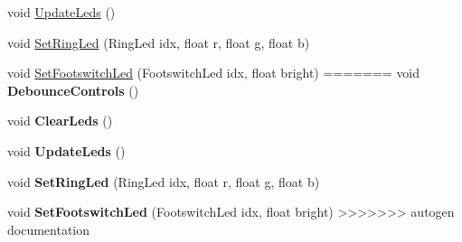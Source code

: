 \begin{DoxyCompactItemize}
\begin{DoxyCompactItemize}
\item 
void \hyperlink{classdaisy_1_1_daisy_petal_ab224cad4e33c800d36ab90184859b006}{Update\+Leds} ()
\item 
void \hyperlink{classdaisy_1_1_daisy_petal_ad92270ffe128bc678b78be2067d4fcfe}{Set\+Ring\+Led} (Ring\+Led idx, float r, float g, float b)
\item 
void \hyperlink{classdaisy_1_1_daisy_petal_a562d597f10b98d36bf1c37314a317d8c}{Set\+Footswitch\+Led} (Footswitch\+Led idx, float bright)
=======
\mbox{\label{classdaisy_1_1_daisy_petal_a4ddb53392d8c9c73b2ff4a4c64dc48e4}} 
void {\bfseries Debounce\+Controls} ()
\item 
\mbox{\label{classdaisy_1_1_daisy_petal_adf75fd1ae8cab917060305ebef00aa12}} 
void {\bfseries Clear\+Leds} ()
\item 
\mbox{\label{classdaisy_1_1_daisy_petal_a2ace6b8f720c3d738d952d3466ff1d5e}} 
void {\bfseries Update\+Leds} ()
\item 
\mbox{\label{classdaisy_1_1_daisy_petal_a568c0a8ae35281e64df2db6cac484cf9}} 
void {\bfseries Set\+Ring\+Led} (Ring\+Led idx, float r, float g, float b)
\item 
\mbox{\label{classdaisy_1_1_daisy_petal_ae6e7525d3919055fb2232df78c64176a}} 
void {\bfseries Set\+Footswitch\+Led} (Footswitch\+Led idx, float bright)
>>>>>>> autogen documentation
\end{DoxyCompactItemize}

\end{DoxyCompactItemize}
